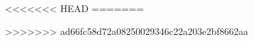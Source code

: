 \usepackage{lastpage}

\usepackage{titleref}


\usepackage{multirow}

\usepackage{enumitem}

\usepackage[format=plain,justification=centerlast,width=15cm,labelsep=period,tablename=Tabla,skip=5pt]{caption}

<<<<<<< HEAD
=======
\usepackage{multicol}

>>>>>>> ad66fc58d72a08250029346c22a203e2bf8662aa

\sloppy 


\frenchspacing 

\setcounter{secnumdepth}{4}		%
\setcounter{tocdepth}{4}		%


\pagestyle{headings} 


%
%
\renewcommand{\topfraction}{0.85}
\renewcommand{\textfraction}{0.1}
\renewcommand{\floatpagefraction}{0.75}

